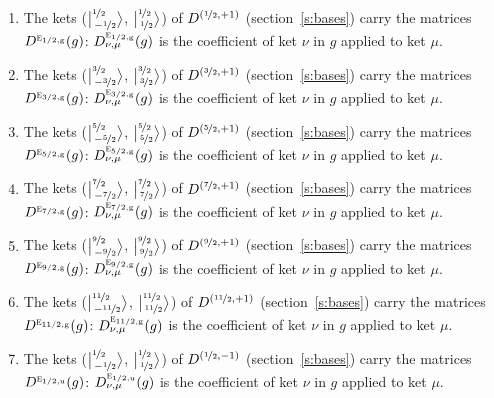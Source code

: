 \documentclass[10pt,a4paper]{article}
\numberwithin{equation}{section}
\newcommand{\irr}[1]{\text{\normalfont\scshape #1}}
\newcommand{\ptag}[1]{\mathrm{#1}}
\newcommand{\irrJp}[2]{D^{(#1,#2)}}
\newcommand{\repD}[1]{D^{#1}}
\newcommand{\intx}{\mu}
\newcommand{\jm}[2]{\bigl\lvert{}^{#1}_{\,#2}\bigr\rangle}
\newenvironment{romanlist}{\begin{enumerate}%
\renewcommand{\labelenumi}{(\roman{enumi})}}%
  {\end{enumerate}}
\begin{document}
\begin{romanlist}\raggedright
\item The kets ($\jm{\nicefrac{1}{2}}{-\nicefrac{1}{2}}$, $\jm{\nicefrac{1}{2}}{\nicefrac{1}{2}}$) of $\irrJp{\nicefrac{1}{2}}{+1}$ (section~\ref{s:bases}) carry the matrices $\repD{\irr{e}_{1/2,\ptag{g}}}(g)$: $\repD{\irr{e}_{1/2,\ptag{g}}}_{\nu,\intx}(g)$ is the coefficient of ket $\nu$ in $g$ applied to ket $\intx$.
\item The kets ($\jm{\nicefrac{3}{2}}{-\nicefrac{3}{2}}$, $\jm{\nicefrac{3}{2}}{\nicefrac{3}{2}}$) of $\irrJp{\nicefrac{3}{2}}{+1}$ (section~\ref{s:bases}) carry the matrices $\repD{\irr{e}_{3/2,\ptag{g}}}(g)$: $\repD{\irr{e}_{3/2,\ptag{g}}}_{\nu,\intx}(g)$ is the coefficient of ket $\nu$ in $g$ applied to ket $\intx$.
\item The kets ($\jm{\nicefrac{5}{2}}{-\nicefrac{5}{2}}$, $\jm{\nicefrac{5}{2}}{\nicefrac{5}{2}}$) of $\irrJp{\nicefrac{5}{2}}{+1}$ (section~\ref{s:bases}) carry the matrices $\repD{\irr{e}_{5/2,\ptag{g}}}(g)$: $\repD{\irr{e}_{5/2,\ptag{g}}}_{\nu,\intx}(g)$ is the coefficient of ket $\nu$ in $g$ applied to ket $\intx$.
\item The kets ($\jm{\nicefrac{7}{2}}{-\nicefrac{7}{2}}$, $\jm{\nicefrac{7}{2}}{\nicefrac{7}{2}}$) of $\irrJp{\nicefrac{7}{2}}{+1}$ (section~\ref{s:bases}) carry the matrices $\repD{\irr{e}_{7/2,\ptag{g}}}(g)$: $\repD{\irr{e}_{7/2,\ptag{g}}}_{\nu,\intx}(g)$ is the coefficient of ket $\nu$ in $g$ applied to ket $\intx$.
\item The kets ($\jm{\nicefrac{9}{2}}{-\nicefrac{9}{2}}$, $\jm{\nicefrac{9}{2}}{\nicefrac{9}{2}}$) of $\irrJp{\nicefrac{9}{2}}{+1}$ (section~\ref{s:bases}) carry the matrices $\repD{\irr{e}_{9/2,\ptag{g}}}(g)$: $\repD{\irr{e}_{9/2,\ptag{g}}}_{\nu,\intx}(g)$ is the coefficient of ket $\nu$ in $g$ applied to ket $\intx$.
\item The kets ($\jm{\nicefrac{11}{2}}{-\nicefrac{11}{2}}$, $\jm{\nicefrac{11}{2}}{\nicefrac{11}{2}}$) of $\irrJp{\nicefrac{11}{2}}{+1}$ (section~\ref{s:bases}) carry the matrices $\repD{\irr{e}_{11/2,\ptag{g}}}(g)$: $\repD{\irr{e}_{11/2,\ptag{g}}}_{\nu,\intx}(g)$ is the coefficient of ket $\nu$ in $g$ applied to ket $\intx$.
\item The kets ($\jm{\nicefrac{1}{2}}{-\nicefrac{1}{2}}$, $\jm{\nicefrac{1}{2}}{\nicefrac{1}{2}}$) of $\irrJp{\nicefrac{1}{2}}{-1}$ (section~\ref{s:bases}) carry the matrices $\repD{\irr{e}_{1/2,\ptag{u}}}(g)$: $\repD{\irr{e}_{1/2,\ptag{u}}}_{\nu,\intx}(g)$ is the coefficient of ket $\nu$ in $g$ applied to ket $\intx$.

\end{romanlist}
\end{document}

